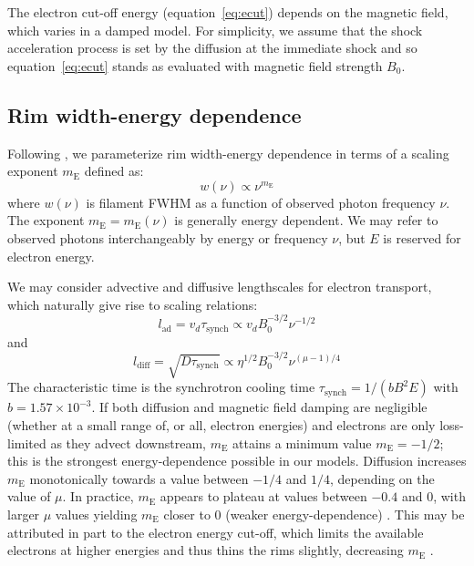 \documentclass[iop, apj, numberedappendix]{emulateapj}
\newcommand*{\mt}{\mathrm}
\newcommand*{\tsynch}{\tau_{\mt{synch}}}
\newcommand*{\mE}{m_\mt{E}}
\begin{document}
The electron cut-off energy (equation~\eqref{eq:ecut}) depends on the magnetic
field, which varies in a damped model.  For simplicity, we assume that the
shock acceleration process is set by the diffusion at the immediate shock and
so equation~\eqref{eq:ecut} stands as evaluated with magnetic field strength
$B_0$.

\subsection{Rim width-energy dependence} \label{sec:energydep}

Following , we parameterize rim width-energy dependence
in terms of a scaling exponent $\mE$ defined as:
\begin{equation}
    w(\nu) \propto \nu^{\mE}
\end{equation}
where $w(\nu)$ is filament FWHM as a function of observed photon frequency
$\nu$.  The exponent $\mE = \mE(\nu)$ is generally energy dependent.  We may
refer to observed photons interchangeably by energy or frequency $\nu$, but $E$
is reserved for electron energy.

We may consider advective and diffusive lengthscales for electron transport,
which naturally give rise to scaling relations:
\begin{equation} \label{eq:lad}
    l_{\mt{ad}} = v_d \tsynch \propto v_d B_0^{-3/2} \nu^{-1/2}
\end{equation}
and
\begin{equation} \label{eq:ldiff}
    l_{\mt{diff}} = \sqrt{D \tsynch} \propto \eta^{1/2} B_0^{-3/2} \nu^{(\mu-1)/4}
\end{equation}
The characteristic time is the synchrotron cooling time
$\tsynch = 1 / (b B^2 E)$ with $b = 1.57 \times 10^{-3}$.
If both diffusion and magnetic field damping are negligible (whether at a small
range of, or all, electron energies) and electrons are only loss-limited as
they advect downstream, $\mE$ attains a minimum value $\mE = -1/2$; this is the
strongest energy-dependence possible in our models.  Diffusion increases $\mE$
monotonically towards a value between $-1/4$ and $1/4$, depending on the value
of $\mu$.  In practice, $\mE$ appears to plateau at values between $-0.4$ and
$0$, with larger $\mu$ values yielding $\mE$ closer to $0$ (weaker
energy-dependence) .  This may be attributed
in part to the electron energy cut-off, which limits the available electrons at
higher energies and thus thins the rims slightly, decreasing $\mE$
.
\end{document}
